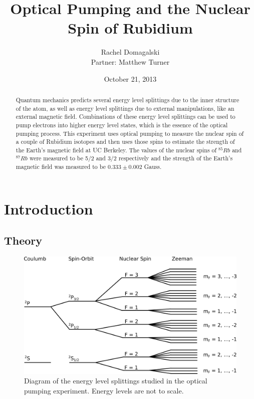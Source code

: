 \documentclass[11pt,letterpaper]{article}
\title{Optical Pumping and the Nuclear Spin of Rubidium}
\author{Rachel Domagalski\\
Partner: Matthew Turner}
\date{October 21, 2013}
\begin{document}
\maketitle

\begin{abstract}
    Quantum mechanics predicts several energy level splittings due to the inner
    structure of the atom, as well as energy level splittings due to external
    manipulations, like an external magnetic field. Combinations of these energy
    level splittings can be used to pump electrons into higher energy level
    states, which is the essence of the optical pumping process. This experiment
    uses optical pumping to measure the nuclear spin of a couple of Rubidium
    isotopes and then uses those spins to estimate the strength of the Earth's
    magnetic field at UC Berkeley. The values of the nuclear spins of $^{85}Rb$
    and $^{87}Rb$ were measured to be 5/2 and 3/2 respectively and the strength
    of the Earth's magnetic field was measured to be $0.333 \pm 0.002$ Gauss.
\end{abstract}

\section{Introduction}

\subsection{Theory}

\begin{figure}
    \centering
    \includegraphics[width=\textwidth]{figures/splittings.png}
    \caption{Diagram of the energy level splittings studied in the optical
    pumping experiment. Energy levels are not to scale.}
    \label{optenergylvl}
\end{figure}
\end{document}
